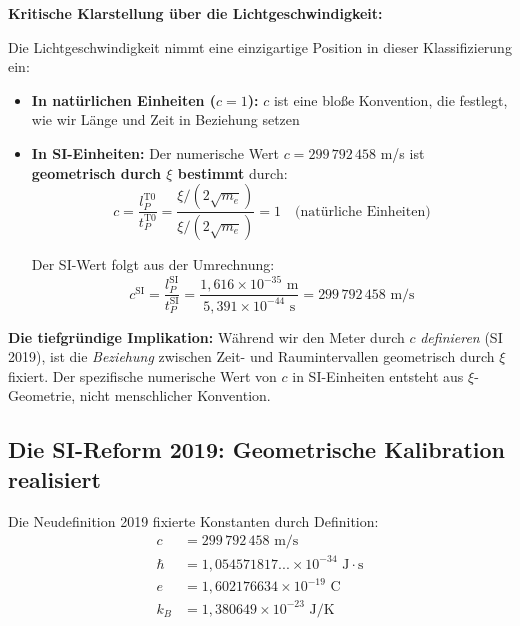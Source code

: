 	\begin{warning}
		\textbf{Kritische Klarstellung über die Lichtgeschwindigkeit:}
		
		Die Lichtgeschwindigkeit nimmt eine einzigartige Position in dieser Klassifizierung ein:
		
		\begin{itemize}
			\item \textbf{In natürlichen Einheiten ($c = 1$):} $c$ ist eine bloße Konvention, die festlegt, wie wir Länge und Zeit in Beziehung setzen
			
			\item \textbf{In SI-Einheiten:} Der numerische Wert $c = 299\,792\,458$ m/s ist \textbf{geometrisch durch $\xi$ bestimmt} durch:
			\begin{equation}
				c = \frac{l_P^{\text{T0}}}{t_P^{\text{T0}}} = \frac{\xi/(2\sqrt{m_e})}{\xi/(2\sqrt{m_e})} = 1 \quad \text{(natürliche Einheiten)}
			\end{equation}
			
			Der SI-Wert folgt aus der Umrechnung:
			\begin{equation}
				c^{\text{SI}} = \frac{l_P^{\text{SI}}}{t_P^{\text{SI}}} = \frac{1{,}616 \times 10^{-35} \text{ m}}{5{,}391 \times 10^{-44} \text{ s}} = 299\,792\,458 \text{ m/s}
			\end{equation}
		\end{itemize}
		
		\textbf{Die tiefgründige Implikation:} Während wir den Meter durch $c$ \emph{definieren} (SI 2019), ist die \emph{Beziehung} zwischen Zeit- und Raumintervallen geometrisch durch $\xi$ fixiert. Der spezifische numerische Wert von $c$ in SI-Einheiten entsteht aus $\xi$-Geometrie, nicht menschlicher Konvention.
	\end{warning}
	
	\subsection{Die SI-Reform 2019: Geometrische Kalibration realisiert}
	
	Die Neudefinition 2019 fixierte Konstanten durch Definition:
	\begin{align}
		c &= 299\,792\,458 \text{ m/s} \\
		\hbar &= 1{,}054571817... \times 10^{-34} \text{ J}\cdot\text{s} \\
		e &= 1{,}602176634 \times 10^{-19} \text{ C} \\
		k_B &= 1{,}380649 \times 10^{-23} \text{ J/K}
	\end{align}
	
